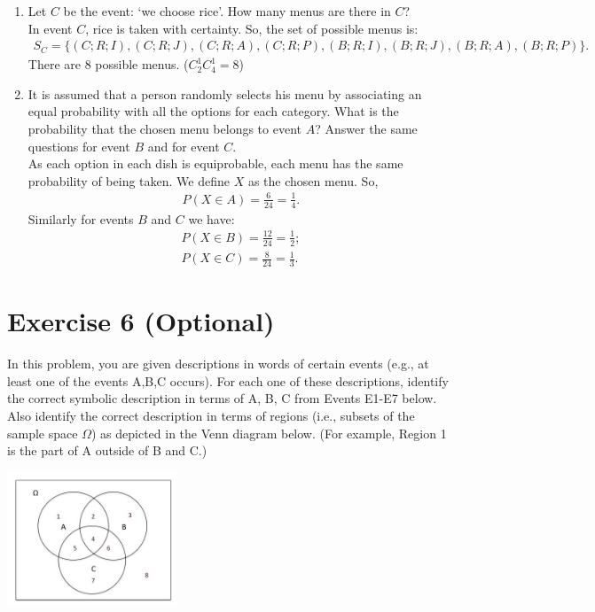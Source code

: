 \documentclass[12pt,thmsa]{article}
\begin{document}
\begin{enumerate}
\item Let $C$ be the event: `we choose rice'. How many menus are there in $C$?\\
 In event $C$, rice is taken with certainty. So, the set of possible menus is:
\begin{align*}
S_C = \{  (C;R;I),(C;R;J),(C;R;A),(C;R;P), (B;R;I),(B;R;J),(B;R;A),(B;R;P) \}.
\end{align*}
There are 8 possible menus. ($C^{1}_{2}C^{1}_{4}=8$)
\medskip

 \item It is assumed that a person randomly selects his menu by associating an equal probability with
all the options for each category. What is the probability that the chosen menu belongs to event $A$?
Answer the same questions for event $B$ and for event $C$.\\
 As each option in each dish is equiprobable, each menu has the same probability of being taken. We define $X$ as the chosen menu. So,
\begin{align*}
P(X \in A) =  \frac{6}{24} = \frac{1}{4}.
\end{align*}
Similarly for events $B$ and $C$ we have:
\begin{align*}
P(X \in B) = \frac{12} {24} = \frac{1}{2}; \\
P(X \in C) = \frac{8}{24} = \frac{1}{3}.
\end{align*}

\end{enumerate}

\newpage

\section*{Exercise 6 (Optional)}
In this problem, you are given descriptions in words of certain events (e.g., at least one of the events A,B,C occurs). For each one of these descriptions, identify the correct symbolic description in terms of A, B, C from Events E1-E7 below. Also identify the correct description in terms of regions (i.e., subsets of the sample space $\Omega$) as depicted in the Venn diagram below. (For example, Region 1 is the part of A outside of B and C.)
\begin{center}
\includegraphics[width = 2in]{images1.jpg}
\end{center}
\end{document}
